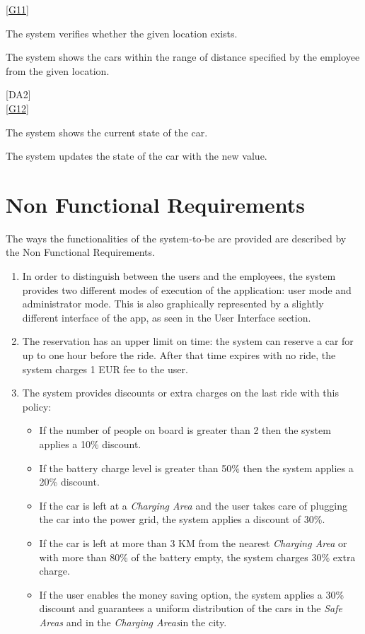 \documentclass[11pt,a4paper]{report}
\begin{document}
\noindent\ref{G11} \\
\begin{Req}[resume]
\item The system verifies whether the given location exists.
\item The system shows the cars within the range of distance specified by the employee from the given location.
\end{Req}
	[DA2] \\
\noindent\ref{G12} \\
\begin{Req}[resume]
\item The system shows the current state of the car.
\item The system updates the state of the car with the new value.
\end{Req}
\section{Non Functional Requirements}
The ways the functionalities of the system-to-be are provided are described by the Non Functional Requirements.\\
\begin{enumerate}
\item In order to distinguish between the users and the employees, the system provides two different modes of execution of the application: user mode and administrator mode. This is also graphically represented by a slightly different interface of the app, as seen in the User Interface section.
\item The reservation has an upper limit on time: the system can reserve a car for up to one hour before the ride. After that time expires with no ride, the system charges 1 EUR fee to the user.
\item The system provides discounts or extra charges on the last ride with this policy:
\begin{itemize}
\item If the number of people on board is greater than 2 then the system applies a 10\% discount.
\item If the battery charge level is greater than 50\% then the system applies a 20\% discount.
\item If the car is left at a \textit{Charging Area} and the user takes care of plugging the car into the power grid, the system applies a discount of 30\%.
\item  If the car is left at more than 3 KM from the nearest \textit{Charging Area} or with more than 80\% of the battery empty, the system charges 30\% extra charge.
\item  If the user enables the money saving option, the system applies a 30\% discount and guarantees a uniform distribution of the cars in the \textit{Safe Areas} and in the \textit{Charging Areas}in the city.
\end{itemize}
\end{enumerate}
\end{document}
